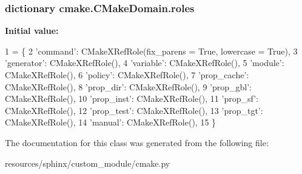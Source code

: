 \subsubsection[{\texorpdfstring{roles}{roles}}]{\setlength{\rightskip}{0pt plus 5cm}dictionary cmake.\+C\+Make\+Domain.\+roles\hspace{0.3cm}{\ttfamily [static]}}\hypertarget{classcmake_1_1CMakeDomain_a1a3a56c898d9720d688dea47de1715aa}{}\label{classcmake_1_1CMakeDomain_a1a3a56c898d9720d688dea47de1715aa}
{\bfseries Initial value\+:}
\begin{DoxyCode}
1 = \{
2         \textcolor{stringliteral}{'command'}:    CMakeXRefRole(fix\_parens = \textcolor{keyword}{True}, lowercase = \textcolor{keyword}{True}),
3         \textcolor{stringliteral}{'generator'}:  CMakeXRefRole(),
4         \textcolor{stringliteral}{'variable'}:   CMakeXRefRole(),
5         \textcolor{stringliteral}{'module'}:     CMakeXRefRole(),
6         \textcolor{stringliteral}{'policy'}:     CMakeXRefRole(),
7         \textcolor{stringliteral}{'prop\_cache'}: CMakeXRefRole(),
8         \textcolor{stringliteral}{'prop\_dir'}:   CMakeXRefRole(),
9         \textcolor{stringliteral}{'prop\_gbl'}:   CMakeXRefRole(),
10         \textcolor{stringliteral}{'prop\_inst'}:  CMakeXRefRole(),
11         \textcolor{stringliteral}{'prop\_sf'}:    CMakeXRefRole(),
12         \textcolor{stringliteral}{'prop\_test'}:  CMakeXRefRole(),
13         \textcolor{stringliteral}{'prop\_tgt'}:   CMakeXRefRole(),
14         \textcolor{stringliteral}{'manual'}:     CMakeXRefRole(),
15     \}
\end{DoxyCode}


The documentation for this class was generated from the following file\+:\begin{DoxyCompactItemize}
\item 
resources/sphinx/custom\+\_\+module/cmake.\+py\end{DoxyCompactItemize}
